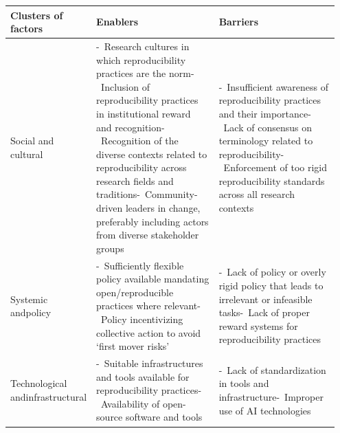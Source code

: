 \documentclass[authordate, meta]{jote-new-article}
\begin{document}
	\begin{table}
		\begin{fullwidth}
		
		\begin{tabularx}{\linewidth}{@{} p{0.15\linewidth} p{0.4\linewidth} p{0.4\linewidth} @{}}
			\hline \textbf{Clusters of \newline factors} & \textbf{Enablers} & \textbf{Barriers}
			\\

			\hline Social and cultural &
			\mbox{- Research} cultures in which reproducibility practices are the norm\newline \newline \mbox{- Inclusion} of reproducibility practices in institutional reward and recognition\newline\newline  \mbox{- Recognition} of the diverse contexts related to reproducibility across research fields and traditions\newline \newline \mbox{- Community-driven} leaders in change, preferably including actors from diverse stakeholder groups
			& \mbox{- Insufficient} awareness of reproducibility practices and their importance\newline \newline \mbox{- Lack} of consensus on terminology related to reproducibility\newline \newline \mbox{- Enforcement} of too rigid reproducibility standards across all research contexts
			\\

			\hline Systemic and\newline policy &
			\mbox{- Sufficiently} flexible policy available mandating open/reproducible practices where relevant\newline \newline \mbox{- Policy} incentivizing collective action to avoid ‘first mover risks’
			& \mbox{- Lack} of policy or overly rigid policy that leads to irrelevant or infeasible tasks\newline \newline \mbox{- Lack} of proper reward systems for reproducibility practices
			\\

			\hline Technological and\newline infrastructural & \mbox{- Suitable} infrastructures and tools available for reproducibility practices\newline \newline \mbox{- Availability} of open-source software and tools
			& \mbox{- Lack} of standardization in tools and infrastructure\newline \newline \mbox{- Improper} use of AI technologies
			\\


\end{tabularx}
\end{fullwidth}
\end{table}
\end{document}
